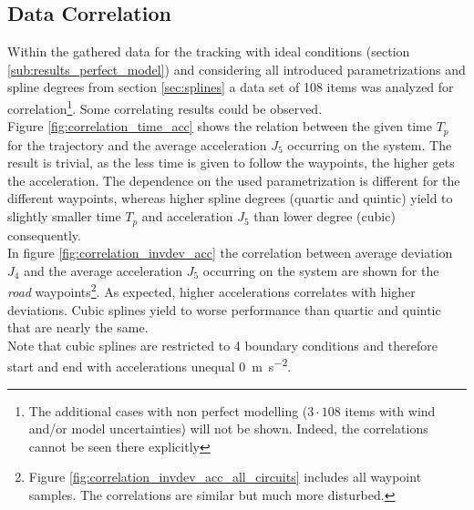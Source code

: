 \subsection{Data Correlation}
Within the gathered data for the tracking with ideal conditions (section \ref{sub:results_perfect_model}) and considering all introduced parametrizations and spline degrees from section \ref{sec:splines} a data set of 108 items was analyzed for correlation\footnote{The additional cases with non perfect modelling ($3\cdot 108$ items with wind and/or model uncertainties) will not be shown. Indeed, the correlations cannot be seen there explicitly}. Some correlating results could be observed. \\
Figure \ref{fig:correlation_time_acc} shows the relation between the given time $T_p$ for the trajectory and the average acceleration $J_5$ occurring on the system. The result is trivial, as the less time is given to follow the waypoints, the higher gets the acceleration. The dependence on the used parametrization is different for the different waypoints, whereas higher spline degrees (quartic and quintic) yield to slightly smaller time $T_p$ and acceleration $J_5$ than lower degree (cubic) consequently. \\
In figure \ref{fig:correlation_invdev_acc} the correlation between average deviation $J_4$ and the average acceleration $J_5$ occurring on the system are shown for the \textit{road} waypoints\footnote{Figure \ref{fig:correlation_invdev_acc_all_circuits} includes all waypoint samples. The correlations are similar but much more disturbed.}. As expected, higher accelerations correlates with higher deviations. Cubic splines yield to worse performance than quartic and quintic that are nearly the same.
\\ Note that cubic splines are restricted to \num{4} boundary conditions and therefore start and end with accelerations unequal \SI{0}{\meter\per\square\second}. 


